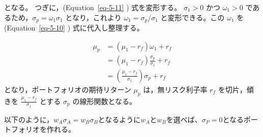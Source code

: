 \documentclass[
  letterpaper,
  pandoc,
  ja=standard,
  jafont = hiragino-pron]{ltjsbook}
\begin{document}
となる。 つぎに，(Equation~\ref{eq-5-11} ) 式を変形する。 \(\sigma_1>0\)
かつ \(\omega_1 >0\) であるため，\(\sigma _p = \omega _1 \sigma _1\)
となり，これより \(\omega_1 = \sigma _p / \sigma_1\) と変形できる。この
\(\omega_1\) を(Equation~\ref{eq-5-10} ) 式に代入し整理する。

\[
\begin{aligned}
\mu_p &= (\mu_1 - r_f) \omega _1 + r_f \\
      &= (\mu_1 - r_f) \frac{\sigma_p}{\sigma_1} + r_f \\
      &= \left ( \frac{\mu _1- r_f}{\sigma_1} \right ) \sigma _p +r_f
\end{aligned}
\] となり，ポートフォリオの期待リターン \(\mu _p\) は，無リスク利子率
\(r_f\) を切片，傾きを \(\frac{\mu _1 - r_f}{\sigma _1}\) とする
\(\sigma_p\) の線形関数となる。

以下のように，\(w_A \sigma _A = w_B \sigma_B\)となるように\(w_A\)と\(w_B\)を選べば、\(\sigma _P = 0\)となるポートフォリオを作れる。
\end{document}
